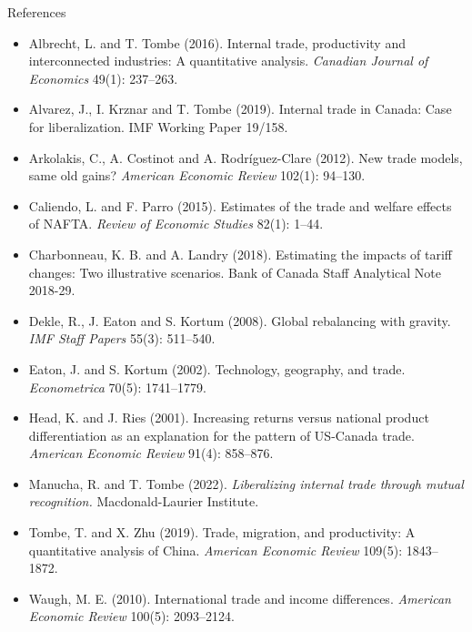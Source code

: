 \documentclass[aspectratio=169,9pt,t]{beamer}
\begin{document}
\begin{frame}{References}
  \footnotesize
  \begin{itemize}
    \setlength{\itemsep}{0.25em}
    \item Albrecht, L. and T. Tombe (2016). Internal trade, productivity and
      interconnected industries: A quantitative analysis. \emph{Canadian
      Journal of Economics} 49(1): 237--263.
    \item Alvarez, J., I. Krznar and T. Tombe (2019). Internal trade in
      Canada: Case for liberalization. IMF Working Paper 19/158.
    \item Arkolakis, C., A. Costinot and A. Rodr\'iguez-Clare (2012). New
      trade models, same old gains? \emph{American Economic Review} 102(1):
      94--130.
    \item Caliendo, L. and F. Parro (2015). Estimates of the trade and
      welfare effects of NAFTA. \emph{Review of Economic Studies} 82(1): 1--44.
    \item Charbonneau, K. B. and A. Landry (2018). Estimating the impacts of
      tariff changes: Two illustrative scenarios. Bank of Canada Staff
      Analytical Note 2018-29.
    \item Dekle, R., J. Eaton and S. Kortum (2008). Global rebalancing with
      gravity. \emph{IMF Staff Papers} 55(3): 511--540.
    \item Eaton, J. and S. Kortum (2002). Technology, geography, and trade.
      \emph{Econometrica} 70(5): 1741--1779.
    \item Head, K. and J. Ries (2001). Increasing returns versus national
      product differentiation as an explanation for the pattern of US-Canada
      trade. \emph{American Economic Review} 91(4): 858--876.
    \item Manucha, R. and T. Tombe (2022). \emph{Liberalizing internal trade
      through mutual recognition.} Macdonald-Laurier Institute.
    \item Tombe, T. and X. Zhu (2019). Trade, migration, and productivity: A
      quantitative analysis of China. \emph{American Economic Review} 109(5):
      1843--1872.
    \item Waugh, M. E. (2010). International trade and income differences.
      \emph{American Economic Review} 100(5): 2093--2124.
  \end{itemize}
\end{frame}
\end{document}
